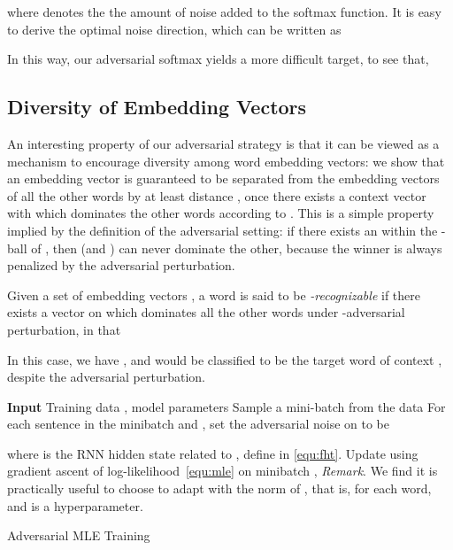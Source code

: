 \documentclass{article}
\begin{document}
where  denotes the the amount of noise added to the softmax function.
It is easy to derive the optimal noise direction, which can be written as

In this way,
our adversarial softmax yields a more difficult target, to see that, 

\fi 

\subsection{Diversity of Embedding Vectors} 

An interesting property of our adversarial strategy is that  
it can be viewed as a mechanism to encourage diversity among word embedding vectors: we show that an embedding vector  is guaranteed 
to be separated from the embedding vectors of all the other words by at least distance ,
once there exists a context vector  
with which  dominates the other words according to .  
This is a simple property implied by the definition of the adversarial setting:  
if there exists an  within the -ball of , 
then  (and ) can never dominate the other, 
because the winner is always penalized by the adversarial perturbation.   




\begin{mydef}\label{def:word}
Given a set of embedding vectors , 
a word  is said to be \emph{-recognizable} 
if there exists a vector   
on which  dominates 
all the other words under  -adversarial perturbation, in that 

In this case, 
we have , and 
 would be classified to be the target word of context , despite the adversarial perturbation. 
\end{mydef}




\begin{algorithm}[t] \begin{algorithmic} \STATE \textbf{Input} Training data , model parameters 
    \STATE Sample a mini-batch  from the data  
    \STATE For each sentence  in the minibatch and , 
set the adversarial noise on  to be  
    
    where  is the RNN hidden state related to , define in \eqref{equ:fht}.  
\STATE Update  using gradient ascent of log-likelihood~\eqref{equ:mle} on minibatch , 
\ENDWHILE 
\STATE 
\emph{Remark}. We find it is practically useful to choose  to adapt with the norm of , that is, 
 for each word, and  is a hyperparameter.     
\end{algorithmic}
\caption{Adversarial MLE Training} 
\label{alg:main} 
\end{algorithm}
\end{document}

